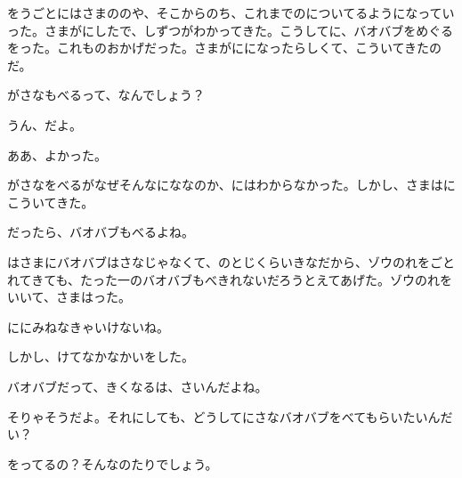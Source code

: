 をうごとにはさまののや、そこからのち、これまでのについてるようになっていった。さまがにしたで、しずつがわかってきた。こうしてに、バオバブをめぐるをった。これものおかげだった。さまがにになったらしくて、こういてきたのだ。

がさなもべるって、なんでしょう？

うん、だよ。

ああ、よかった。

がさなをべるがなぜそんなにななのか、にはわからなかった。しかし、さまはにこういてきた。

だったら、バオバブもべるよね。

はさまにバオバブはさなじゃなくて、のとじくらいきなだから、ゾウのれをごとれてきても、たった一のバオバブもべきれないだろうとえてあげた。ゾウのれをいいて、さまはった。

ににみねなきゃいけないね。

しかし、けてなかなかいをした。

バオバブだって、きくなるは、さいんだよね。

そりゃそうだよ。それにしても、どうしてにさなバオバブをべてもらいたいんだい？

をってるの？そんなのたりでしょう。

